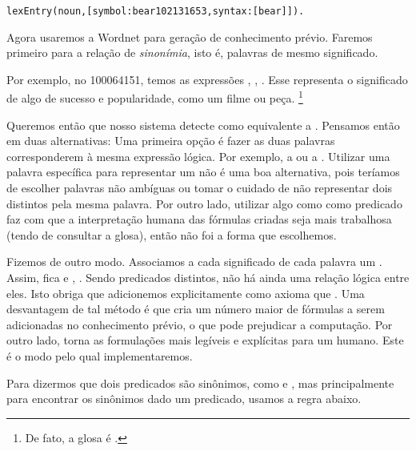 	\begin{Verbatim}[fontseries=b,gobble=2]
		lexEntry(noun,[symbol:bear102131653,syntax:[bear]]).
	\end{Verbatim}
	
	Agora usaremos a Wordnet para geração de conhecimento prévio. Faremos primeiro para a relação de \textit{sinonímia}, isto é, palavras de mesmo significado.

	Por exemplo, no  100064151, temos as expressões , , . Esse  representa o significado de algo de sucesso e popularidade, como um filme ou peça.
			\footnote{De fato, a glosa é .}
			
	Queremos então que nosso sistema detecte  como equivalente a . Pensamos então em duas alternativas:
		Uma primeira opção é fazer as duas palavras corresponderem à mesma expressão lógica. Por exemplo, a  ou a . Utilizar uma palavra específica para representar um  não é uma boa alternativa, pois teríamos de escolher palavras não ambíguas ou tomar o cuidado de não representar dois  distintos pela mesma palavra. Por outro lado, utilizar algo como  como predicado faz com que a interpretação humana das fórmulas criadas seja mais trabalhosa (tendo de consultar a glosa), então não foi a forma que escolhemos.
		
		Fizemos de outro modo. Associamos a cada significado de cada palavra um . Assim,  fica  e , . Sendo predicados distintos, não há ainda uma relação lógica entre eles. Isto obriga que adicionemos explicitamente como axioma que . Uma desvantagem de tal método é que cria um número maior de fórmulas a serem adicionadas no conhecimento prévio, o que pode prejudicar a computação. Por outro lado, torna as formulações mais legíveis e explícitas para um humano. Este é o modo pelo qual implementaremos.
		
	Para dizermos que dois predicados são sinônimos, como  e , mas principalmente para encontrar os sinônimos dado um predicado, usamos a regra abaixo.
	
